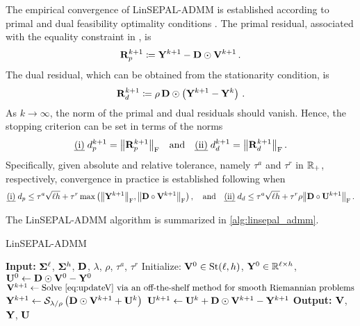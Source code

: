 The empirical convergence of LinSEPAL-ADMM is established according to primal and dual feasibility optimality conditions .
The primal residual, associated with the equality constraint in , is
\begin{equation}\label{eq:primal_res_madmm}
    \mathbf{R}_p^{k+1}\coloneqq\mathbf{Y}^{k+1}-\mathbf{D}\odot\mathbf{V}^{k+1}\,.
\end{equation}
The dual residual, which can be obtained from the stationarity condition, is
\begin{equation}\label{eq:dual_res_madmm}
    \mathbf{R}_d^{k+1}\coloneqq \rho \,\mathbf{D} \odot\left(\mathbf{Y}^{k+1}-\mathbf{Y}^k\right)\,.
\end{equation}
As $k \rightarrow \infty$, the norm of the primal and dual residuals should vanish.
Hence, the stopping criterion can be set in terms of the norms
\begin{equation}\label{eq:norms_madmm}
    \text{\emph{(i)}}\;d_p^{k+1}=\norm{\mathbf{R}_p^{k+1}}_{\mathrm{F}} \quad \text{and} \quad \text{\emph{(ii)}}\;d_d^{k+1}=\norm{\mathbf{R}_d^{k+1}}_{\mathrm{F}}\,. 
\end{equation}
Specifically, given absolute and relative tolerance, namely $\tau^a$ and $\tau^r$ in $\mathbb{R}_+$, respectively, convergence in practice is established following  when 
\begin{equation}\label{eq:convergence_linsepal}
    \text{\emph{(i)}}\; d_p \leq \tau^a\sqrt{\ell h} + \tau^r \max{\left(\frob{\Y^{k+1}}, \frob{\D \circ \V^{k+1}}\right)}\,, \quad
    \text{and} \quad
    \text{\emph{(ii)}}\; d_d \leq \tau^a\sqrt{\ell h} + \tau^r \rho  \frob{\D \circ \scaledU^{k+1}}\,.
\end{equation}

The LinSEPAL-ADMM algorithm is summarized in \cref{alg:linsepal_admm}.

\begin{algorithm}[H]
\caption{LinSEPAL-ADMM}
\label{alg:linsepal_admm}
\begin{algorithmic}[1]
\STATE \textbf{Input:} $\boldsymbol{\Sigma}^{\ell}$, $\boldsymbol{\Sigma}^{h}$, $\mathbf{D}$, $\lambda$, $\rho$, $\tau^a$, $\tau^r$
\STATE Initialize: $\mathbf{V}^0 \in \mathrm{St}({\ell},{h})$, $\mathbf{Y}^0 \in \mathbb{R}^{\ell \times h}$, $\mathbf{U}^0 \gets \mathbf{D} \odot \mathbf{V}^0 - \mathbf{Y}^0$
\REPEAT
    \STATE $\V^{k+1} \gets \text{Solve \cref{eq:updateV} via an off-the-shelf method for smooth Riemannian problems}$ 
    \STATE $\mathbf{Y}^{k+1} \gets \mathcal{S}_{\lambda/\rho}\left( \mathbf{D} \odot \mathbf{V}^{k+1} + \mathbf{U}^k \right)$
    \STATE $\mathbf{U}^{k+1} \gets \mathbf{U}^k + \mathbf{D} \odot \mathbf{V}^{k+1} - \mathbf{Y}^{k+1}$
\STATE \textbf{Output:} $\mathbf{V}$, $\mathbf{Y}$, $\mathbf{U}$
\end{algorithmic}
\end{algorithm} 
